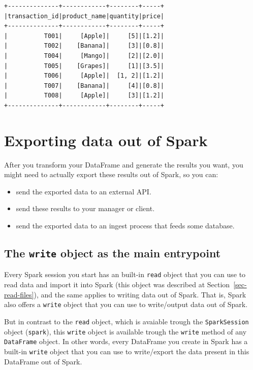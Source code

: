\documentclass[
  11pt,
  letterpaper,
  DIV=11,
  numbers=noendperiod]{scrreprt}
\providecommand{\tightlist}{%
  \setlength{\itemsep}{0pt}\setlength{\parskip}{0pt}}\usepackage{longtable,booktabs,array}
\begin{document}
\begin{verbatim}
+--------------+------------+--------+-----+
|transaction_id|product_name|quantity|price|
+--------------+------------+--------+-----+
|          T001|     [Apple]|     [5]|[1.2]|
|          T002|    [Banana]|     [3]|[0.8]|
|          T004|     [Mango]|     [2]|[2.0]|
|          T005|    [Grapes]|     [1]|[3.5]|
|          T006|     [Apple]|  [1, 2]|[1.2]|
|          T007|    [Banana]|     [4]|[0.8]|
|          T008|     [Apple]|     [3]|[1.2]|
+--------------+------------+--------+-----+
\end{verbatim}


\chapter{Exporting data out of Spark}\label{sec-export}

After you transform your DataFrame and generate the results you want,
you might need to actually export these results out of Spark, so you
can:

\begin{itemize}
\tightlist
\item
  send the exported data to an external API.
\item
  send these results to your manager or client.
\item
  send the exported data to an ingest process that feeds some database.
\end{itemize}

\section{\texorpdfstring{The \texttt{write} object as the main
entrypoint}{The write object as the main entrypoint}}\label{the-write-object-as-the-main-entrypoint}

Every Spark session you start has an built-in \texttt{read} object that
you can use to read data and import it into Spark (this object was
described at Section~\ref{sec-read-files}), and the same applies to
writing data out of Spark. That is, Spark also offers a \texttt{write}
object that you can use to write/output data out of Spark.

But in contrast to the \texttt{read} object, which is avaiable trough
the \texttt{SparkSession} object (\texttt{spark}), this \texttt{write}
object is available trough the \texttt{write} method of any
\texttt{DataFrame} object. In other words, every DataFrame you create in
Spark has a built-in \texttt{write} object that you can use to
write/export the data present in this DataFrame out of Spark.
\end{document}
